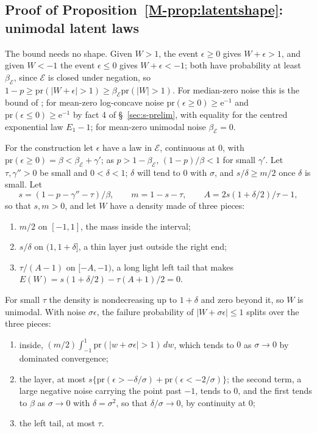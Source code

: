 \documentclass[11pt]{article}
\renewcommand{\_}{\usc\allowbreak}
\newcommand{\pr}{\mathrm{pr}}
\begin{document}
\subsection*{Proof of Proposition~\ref{M-prop:latentshape}: unimodal latent laws}

The bound needs no shape. Given $W > 1$, the event $\epsilon \ge 0$ gives $W + \epsilon > 1$, and given $W < -1$ the event $\epsilon \le 0$ gives $W + \epsilon < -1$; both have probability at least $\beta_{\mathcal E}$, since $\mathcal E$ is closed under negation, so $1 - p \ge \pr(|W + \epsilon| > 1) \ge \beta_{\mathcal E}\pr(|W| > 1)$. For median-zero noise this is the bound of \citet{guille2024}; for mean-zero log-concave noise $\pr(\epsilon \ge 0) \ge \mathrm{e}^{-1}$ and $\pr(\epsilon \le 0) \ge \mathrm{e}^{-1}$ by fact 4 of \S~\ref{sec:s-prelim}, with equality for the centred exponential law $E_1 - 1$; for mean-zero unimodal noise $\beta_{\mathcal E} = 0$.

For the construction let $\epsilon$ have a law in $\mathcal E$, continuous at $0$, with $\pr(\epsilon \ge 0) = \beta < \beta_{\mathcal E} + \gamma'$; as $p > 1 - \beta_{\mathcal E}$, $(1 - p)/\beta < 1$ for small $\gamma'$. Let $\tau, \gamma'' > 0$ be small and $0 < \delta < 1$; $\delta$ will tend to $0$ with $\sigma$, and $s/\delta \ge m/2$ once $\delta$ is small. Let
\[
s = (1 - p - \gamma'' - \tau)/\beta, \qquad m = 1 - s - \tau, \qquad A = 2s(1 + \delta/2)/\tau - 1,
\]
so that $s, m > 0$, and let $W$ have a density made of three pieces:
\begin{enumerate}
\item $m/2$ on $[-1, 1]$, the mass inside the interval;
\item $s/\delta$ on $(1, 1 + \delta]$, a thin layer just outside the right end;
\item $\tau/(A - 1)$ on $[-A, -1)$, a long light left tail that makes $E(W) = s(1 + \delta/2) - \tau(A + 1)/2 = 0$.
\end{enumerate}
For small $\tau$ the density is nondecreasing up to $1 + \delta$ and zero beyond it, so $W$ is unimodal. With noise $\sigma\epsilon$, the failure probability of $|W + \sigma\epsilon| \le 1$ splits over the three pieces:
\begin{enumerate}
\item inside, $(m/2)\int_{-1}^{1} \pr(|w + \sigma\epsilon| > 1)\,dw$, which tends to $0$ as $\sigma \to 0$ by dominated convergence;
\item the layer, at most $s\{\pr(\epsilon > -\delta/\sigma) + \pr(\epsilon < -2/\sigma)\}$; the second term, a large negative noise carrying the point past $-1$, tends to $0$, and the first tends to $\beta$ as $\sigma \to 0$ with $\delta = \sigma^2$, so that $\delta/\sigma \to 0$, by continuity at $0$;
\item the left tail, at most $\tau$.
\end{enumerate}
\end{document}
